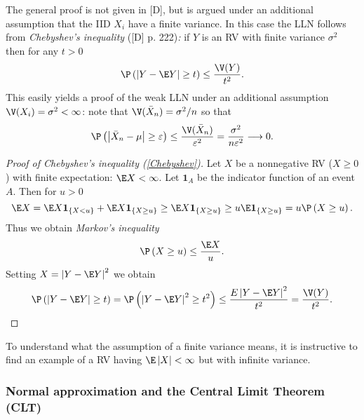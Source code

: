 The general proof is not given in [D], but is argued under an additional
assumption that the IID $X_{i}$ have a finite variance. In this case the
LLN follows from \textit{Chebyshev's inequality }([D] p. 222)\textit{: }if $%
Y $ is an RV with finite variance $\sigma ^{2}$ then for any $t>0$ \textit{%
\ }%
\begin{equation}
\P \left( \left\vert Y-\E Y\right\vert \geq t\right) \leq \frac{\V%
(Y)}{t^{2}}.  \label{Chebyshev}
\end{equation}%
This easily yields a proof of the weak LLN under an additional assumption $%
\V(X_{i})=\sigma ^{2}<\infty $: note that $\V(\bar{X}%
_{n})=\sigma ^{2}/n$ so that 
\begin{equation*}
\P \left( \left\vert \bar{X}_{n}-\mu \right\vert \geq \varepsilon \right)
\leq \frac{\V(\bar{X}_{n})}{\varepsilon ^{2}}=\frac{\sigma ^{2}}{%
n\varepsilon ^{2}}\longrightarrow 0.
\end{equation*}

\begin{proof}[Proof of Chebyshev's inequality (\protect\ref{Chebyshev})]
Let $X$ be a nonnegative RV ($X\geq 0$ ) with finite expectation: $%
\E X<\infty $. Let $\mathbf{1}_{A}$ be the indicator function of an event $A$.
Then for $u>0$ 
\begin{equation*}
\E X=\E X\mathbf{1}_{\left\{ X<u\right\} }+\E X\mathbf{1}_{\left\{ X\geq u\right\}
}\geq \E X\mathbf{1}_{\left\{ X\geq u\right\} }\geq u \E \mathbf{1}_{\left\{
X\geq u\right\} }=u\P \left( X\geq u\right) .
\end{equation*}%
Thus we obtain \textit{Markov's inequality} 
\begin{equation*}
\P \left( X\geq u\right) \leq \frac{\E X}{u}.
\end{equation*}%
Setting $X=\left\vert Y-\E Y\right\vert ^{2}$ we obtain 
\begin{equation*}
\P \left( \left\vert Y-\E Y\right\vert \geq t\right) =\P \left( \left\vert
Y-\E Y\right\vert ^{2}\geq t^{2}\right) \leq \frac{E\left\vert Y-\E Y\right\vert
^{2}}{t^{2}}=\frac{\V(Y)}{t^{2}}.
\end{equation*}
\end{proof}

\bigskip \bigskip To understand what the assumption of a finite variance
means, it is instructive to find an example of a RV having $\E\left\vert
X\right\vert <\infty $ but with infinite variance.

\subsubsection{Normal approximation and the Central Limit Theorem (CLT)}

